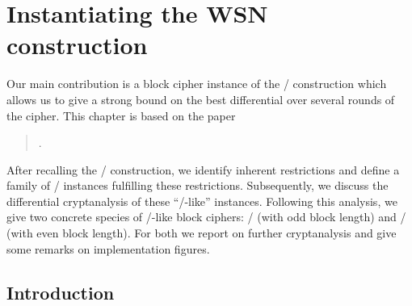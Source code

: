 \chapter{Instantiating the WSN construction}\label{ch:bison}

\hspace{1.5em}
Our main contribution is a block cipher instance of the \WSN/ construction which allows us to give a strong bound on the best differential over several rounds of the cipher.
This chapter is based on the paper
\begin{quote}
    .
\end{quote}

After recalling the \WSN/ construction, we identify inherent restrictions and define a family of \WSN/ instances fulfilling these restrictions.
Subsequently, we discuss the differential cryptanalysis of these \enquote{\bison/-like} instances.
Following this analysis, we give two concrete species of \bison/-like block ciphers: \bison/ (with odd block length) and \wisent/ (with even block length).
For both we report on further cryptanalysis and give some remarks on implementation figures.


\section{Introduction}

